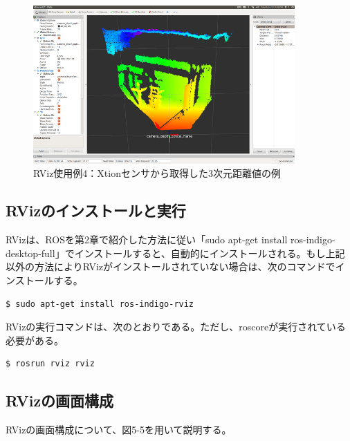 \begin{figure}[h]
  \centering
  \includegraphics[width=10cm]{pictures/chapter5/pic_05_04.png}
  \caption{RViz使用例4：Xtionセンサから取得した3次元距離値の例}
\end{figure}

\subsection{RVizのインストールと実行}

RVizは、ROSを第2章で紹介した方法に従い「sudo apt-get install ros-indigo-desktop-full」でインストールすると、自動的にインストールされる。もし上記以外の方法によりRVizがインストールされていない場合は、次のコマンドでインストールする。

\vspace{\baselineskip}
\begin{lstlisting}[language=ROS]
$ sudo apt-get install ros-indigo-rviz
\end{lstlisting}

RVizの実行コマンドは、次のとおりである。ただし、roscoreが実行されている必要がある。

\vspace{\baselineskip}
\begin{lstlisting}[language=ROS]
$ rosrun rviz rviz
\end{lstlisting}

\subsection{RVizの画面構成}

RVizの画面構成について、図5-5を用いて説明する。

